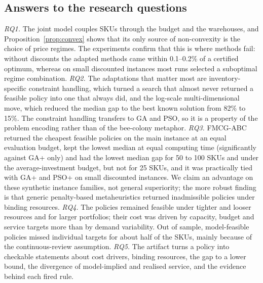 \subsection{Answers to the research questions}
\emph{RQ1.} The joint model couples SKUs through the budget and the warehouses, and Proposition~\ref{prop:convex} shows that its only source of non-convexity is the choice of price regimes. The experiments confirm that this is where methods fail: without discounts the adapted methods came within 0.1--0.2\% of a certified optimum, whereas on small discounted instances most runs selected a suboptimal regime combination.
\emph{RQ2.} The adaptations that matter most are inventory-specific constraint handling, which turned a search that almost never returned a feasible policy into one that always did, and the log-scale multi-dimensional move, which reduced the median gap to the best known solution from 82\% to 15\%. The constraint handling transfers to GA and PSO, so it is a property of the problem encoding rather than of the bee-colony metaphor.
\emph{RQ3.} FMCG-ABC returned the cheapest feasible policies on the main instance at an equal evaluation budget, kept the lowest median at equal computing time (significantly against GA+ only) and had the lowest median gap for 50 to 100 SKUs and under the average-investment budget, but not for 25 SKUs, and it was practically tied with GA+ and PSO+ on small discounted instances. We claim an advantage on these synthetic instance families, not general superiority; the more robust finding is that generic penalty-based metaheuristics returned inadmissible policies under binding resources.
\emph{RQ4.} The policies remained feasible under tighter and looser resources and for larger portfolios; their cost was driven by capacity, budget and service targets more than by demand variability. Out of sample, model-feasible policies missed individual targets for about half of the SKUs, mainly because of the continuous-review assumption.
\emph{RQ5.} The artifact turns a policy into checkable statements about cost drivers, binding resources, the gap to a lower bound, the divergence of model-implied and realised service, and the evidence behind each fired rule.

